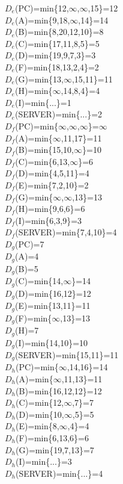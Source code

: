 \documentclass{article}
\begin{document}
{{{$D_e$(PC)=min\{12,$\infty$,$\infty$,15\}=12\\
$D_e$(A)=min\{9,18,$\infty$,14\}=14\\
$D_e$(B)=min\{8,20,12,10\}=8\\
$D_e$(C)=min\{17,11,8,5\}=5\\
$D_e$(D)=min\{19,9,7,3\}=3\\
$D_e$(F)=min\{18,13,2,4\}=2\\
$D_e$(G)=min\{13,$\infty$,15,11\}=11\\
$D_e$(H)=min\{$\infty$,14,8,4\}=4\\
$D_e$(I)=min\{...\}=1\\
$D_e$(SERVER)=min\{...\}=2\\

$D_f$(PC)=min\{$\infty$,$\infty$,$\infty$\}=$\infty$\\
$D_f$(A)=min\{$\infty$,11,17\}=11\\
$D_f$(B)=min\{15,10,$\infty$\}=10\\
$D_f$(C)=min\{6,13,$\infty$\}=6\\
$D_f$(D)=min\{4,5,11\}=4\\
$D_f$(E)=min\{7,2,10\}=2\\
$D_f$(G)=min\{$\infty$,$\infty$,13\}=13\\
$D_f$(H)=min\{9,6,6\}=6\\
$D_f$(I)=min\{6,3,9\}=3\\
$D_f$(SERVER)=min\{7,4,10\}=4\\

$D_g$(PC)=7\\
$D_g$(A)=4\\
$D_g$(B)=5\\
$D_g$(C)=min\{14,$\infty$\}=14\\
$D_g$(D)=min\{16,12\}=12\\
$D_g$(E)=min\{13,11\}=11\\
$D_g$(F)=min\{$\infty$,13\}=13\\
$D_g$(H)=7\\
$D_g$(I)=min\{14,10\}=10\\
$D_g$(SERVER)=min\{15,11\}=11\\

$D_h$(PC)=min\{$\infty$,14,16\}=14\\
$D_h$(A)=min\{$\infty$,11,13\}=11\\
$D_h$(B)=min\{16,12,12\}=12\\
$D_h$(C)=min\{12,$\infty$,7\}=7\\
$D_h$(D)=min\{10,$\infty$,5\}=5\\
$D_h$(E)=min\{8,$\infty$,4\}=4\\
$D_h$(F)=min\{6,13,6\}=6\\
$D_h$(G)=min\{19,7,13\}=7\\
$D_h$(I)=min\{...\}=3\\
$D_h$(SERVER)=min\{...\}=4\\

}}}
\end{document}
